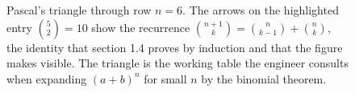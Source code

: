 \begin{figure}[htbp]
\caption[Pascal's triangle and the binomial recurrence]{Pascal's
triangle through row $n = 6$. The arrows on the highlighted entry
$\binom{5}{2} = 10$ show the recurrence $\binom{n+1}{k} = \binom{n}{k-1}
+ \binom{n}{k}$, the identity that section 1.4 proves by induction
and that the figure makes visible. The triangle is the working table
the engineer consults when expanding $(a+b)^{n}$ for small $n$ by
the binomial theorem.}
\label{fig:vol02:ch01:pascal-triangle}
\end{figure}
